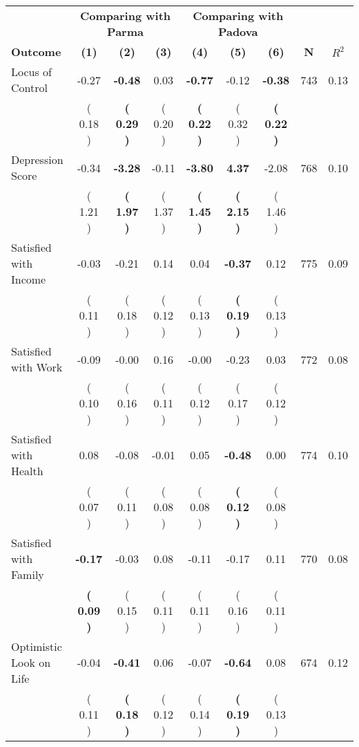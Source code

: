 \begin{tabular}{lcccccccc}
\toprule
 & \multicolumn{3}{c}{\textbf{Comparing with Parma}} & \multicolumn{3}{c}{\textbf{Comparing with Padova}} & \\
\cmidrule(lr){2-4} \cmidrule(lr){5-7} 
 \textbf{Outcome} & \textbf{(1)} & \textbf{(2)} & \textbf{(3)} & \textbf{(4)} & \textbf{(5)} & \textbf{(6)} & \textbf{N} & \textbf{$ R^2$} \\
\midrule
Locus of Control &     -0.27 & \textbf{    -0.48} &      0.03 & \textbf{    -0.77} &     -0.12 & \textbf{    -0.38} & 743 &       0.13 \\ 
 & (     0.18 ) & \textbf{(     0.29 )} & (     0.20 ) & \textbf{(     0.22 )} & (     0.32 ) & \textbf{(     0.22 )} & \\
Depression Score &     -0.34 & \textbf{    -3.28} &     -0.11 & \textbf{    -3.80} & \textbf{     4.37} &     -2.08 & 768 &       0.10 \\ 
 & (     1.21 ) & \textbf{(     1.97 )} & (     1.37 ) & \textbf{(     1.45 )} & \textbf{(     2.15 )} & (     1.46 ) & \\
Satisfied with Income &     -0.03 &     -0.21 &      0.14 &      0.04 & \textbf{    -0.37} &      0.12 & 775 &       0.09 \\ 
 & (     0.11 ) & (     0.18 ) & (     0.12 ) & (     0.13 ) & \textbf{(     0.19 )} & (     0.13 ) & \\
Satisfied with Work &     -0.09 &     -0.00 &      0.16 &     -0.00 &     -0.23 &      0.03 & 772 &       0.08 \\ 
 & (     0.10 ) & (     0.16 ) & (     0.11 ) & (     0.12 ) & (     0.17 ) & (     0.12 ) & \\
Satisfied with Health &      0.08 &     -0.08 &     -0.01 &      0.05 & \textbf{    -0.48} &      0.00 & 774 &       0.10 \\ 
 & (     0.07 ) & (     0.11 ) & (     0.08 ) & (     0.08 ) & \textbf{(     0.12 )} & (     0.08 ) & \\
Satisfied with Family & \textbf{    -0.17} &     -0.03 &      0.08 &     -0.11 &     -0.17 &      0.11 & 770 &       0.08 \\ 
 & \textbf{(     0.09 )} & (     0.15 ) & (     0.11 ) & (     0.11 ) & (     0.16 ) & (     0.11 ) & \\
Optimistic Look on Life &     -0.04 & \textbf{    -0.41} &      0.06 &     -0.07 & \textbf{    -0.64} &      0.08 & 674 &       0.12 \\ 
 & (     0.11 ) & \textbf{(     0.18 )} & (     0.12 ) & (     0.14 ) & \textbf{(     0.19 )} & (     0.13 ) & \\

\end{tabular}
